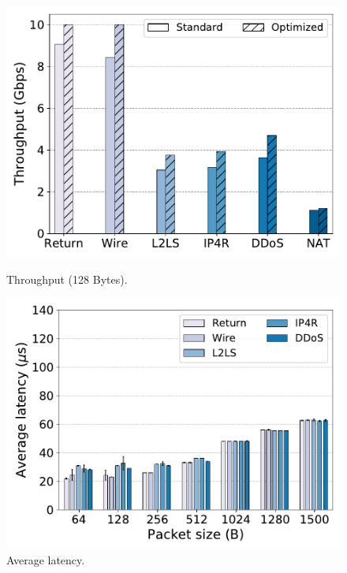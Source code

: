 \begin{figure}[th]
\begin{minipage}[b]{0.3\textwidth}
    \includegraphics[width=.98\textwidth]{figures/throughput_gbps_128B.pdf}
    \caption{Throughput (128 Bytes).}
    \label{fig:throughput128}
  \end{minipage}
  \hspace{0.2cm}
  \begin{minipage}[b]{0.3\textwidth}
    \includegraphics[width=1.\textwidth]{figures/latency.pdf}
    \caption{Average latency.}
    \label{fig:latency}
  \end{minipage}
  \hspace{0.2cm}
  \begin{minipage}[b]{0.3\textwidth}

\end{minipage}
\end{figure}
